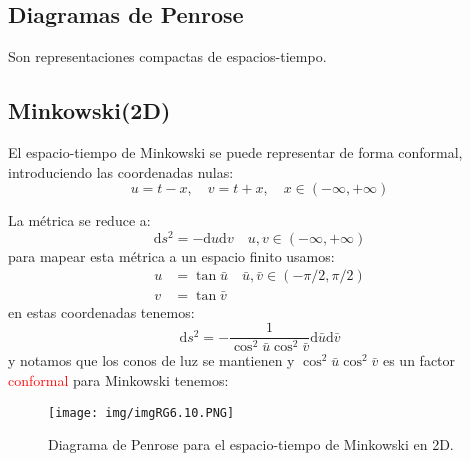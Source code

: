 \documentclass[../main]{subfiles}
\begin{document}
\begin{adjustwidth}{0pt}{-100pt}
\section{Diagramas de Penrose}\label{part6.3}

Son representaciones compactas de espacios-tiempo.

\subsection{Minkowski(2D)}
El espacio-tiempo de Minkowski se puede representar de forma conformal, introduciendo las coordenadas nulas:
\begin{equation}
    u=t-x,\quad v=t+x,\quad x \in (-\infty, +\infty)
\end{equation}

La métrica se reduce a:
\begin{equation}
    \mathrm{d}s^2=-\mathrm{d}u\mathrm{d}v\quad u,v \in (-\infty, +\infty)
\end{equation}
para mapear esta métrica a un espacio finito usamos:
\begin{equation}
    \begin{split}
        u&=\tan \bar{u}\quad \bar{u}, \bar{v} \in (-\pi/2, \pi/2)\\
        v&=\tan \bar{v} 
    \end{split}
\end{equation}
en estas coordenadas tenemos:
\begin{equation}
    \mathrm{d}s^2=-\dfrac{1}{\cos^2 \bar{u} \cos^2 \bar{v}}\mathrm{d}\bar{u}\mathrm{d}\bar{v}
\end{equation}
y notamos que los conos de luz se mantienen y $\cos^2 \bar{u} \cos^2 \bar{v}$ es un factor \textcolor{red}{conformal} para Minkowski tenemos:
\begin{figure}[H]
    \begin{adjustwidth}{0pt}{-100pt}
    \centering
    \texttt{[image: img/imgRG6.10.PNG]}
    \caption{Diagrama de Penrose para el espacio-tiempo de Minkowski en 2D.}
    \end{adjustwidth}
\end{figure}


\end{adjustwidth}
\end{document}
